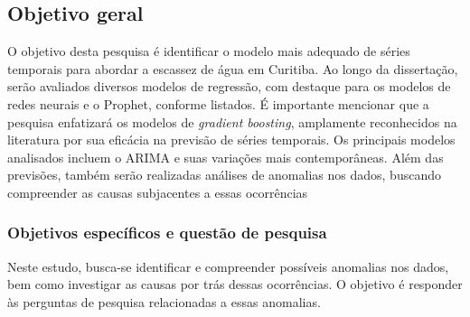 \subsection{Objetivo geral} \label{subsec:objetivos}

O objetivo desta pesquisa é identificar o modelo mais adequado de séries temporais para abordar a escassez de água em Curitiba. Ao longo da dissertação, serão avaliados diversos modelos de regressão, com destaque para os modelos de redes neurais e o Prophet, conforme listados. É importante mencionar que a pesquisa enfatizará os modelos de \textit{gradient boosting}, amplamente reconhecidos na literatura por sua eficácia na previsão de séries temporais. Os principais modelos analisados incluem o ARIMA e suas variações mais contemporâneas. Além das previsões, também serão realizadas análises de anomalias nos dados, buscando compreender as causas subjacentes a essas ocorrências
 
    
    
    \subsubsection{Objetivos espec\'ificos e quest\~ao de pesquisa} \label{subsubsec:obespec}
    
Neste estudo, busca-se identificar e compreender possíveis anomalias nos dados, bem como investigar as causas por trás dessas ocorrências. O objetivo é responder às perguntas de pesquisa relacionadas a essas anomalias.

